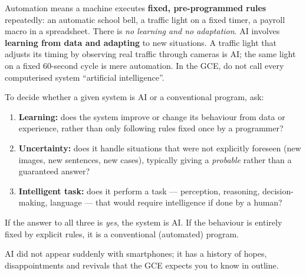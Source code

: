 \documentclass[11pt]{article}
\newcommand{\cle}[1]{{\popxbold\color{popdark}#1}}
\newcounter{popsec}
\newcounter{popsub}
\newcommand{\courssub}[1]{%
  \stepcounter{popsub}%
  \par\vspace{9pt}\noindent{\popxbold\fontsize{11.5}{13}\selectfont\color{popink}{\color{poporange}\thepopsec.\thepopsub}\hspace{6pt}#1}\par\nopagebreak\vspace{4pt}
}
\begin{document}
\begin{attention}
\cle{Automation} means a machine executes \textbf{fixed, pre-programmed rules} repeatedly: an automatic school bell, a traffic light on a fixed timer, a payroll macro in a spreadsheet. There is \emph{no learning and no adaptation}. \cle{AI} involves \textbf{learning from data and adapting} to new situations. A traffic light that adjusts its timing by observing real traffic through cameras is AI; the same light on a fixed 60-second cycle is mere automation. In the GCE, do not call every computerised system ``artificial intelligence''.
\end{attention}

\begin{methode}
To decide whether a given system is AI or a conventional program, ask:
\begin{enumerate}
\item \textbf{Learning:} does the system improve or change its behaviour from data or experience, rather than only following rules fixed once by a programmer?
\item \textbf{Uncertainty:} does it handle situations that were not explicitly foreseen (new images, new sentences, new cases), typically giving a \emph{probable} rather than a guaranteed answer?
\item \textbf{Intelligent task:} does it perform a task --- perception, reasoning, decision-making, language --- that would require intelligence if done by a human?
\end{enumerate}
If the answer to all three is \emph{yes}, the system is AI. If the behaviour is entirely fixed by explicit rules, it is a conventional (automated) program.
\end{methode}

\courssub{A brief history of AI}

AI did not appear suddenly with smartphones; it has a history of hopes, disappointments and revivals that the GCE expects you to know in outline.
\end{document}
